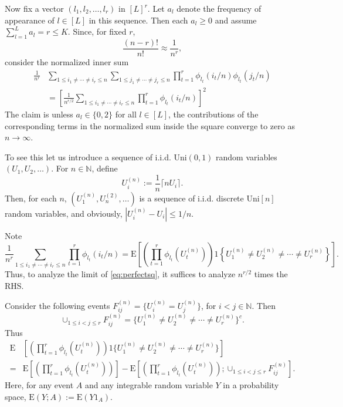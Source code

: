 \documentclass{amsart}
\newcommand{\NN}{\mathbb{N}}
\newcommand{\abs}[1]{\left\lvert #1 \right\rvert}
\newcommand{\E}{\mathrm{E}}
\begin{document}
Now fix a vector $(l_1, l_2, \ldots, l_r)$ in $[L]^r$. Let $a_l$ denote the frequency of appearance of $l\in [L]$ in this sequence. Then each $a_l\ge 0$ and assume $\sum_{l=1}^L a_l =r\le K$. Since, for fixed $r$, 
\[
\frac{(n-r)!}{n!} \approx \frac{1}{n^r}, 
\]
consider the normalized inner sum
\begin{equation}\label{eq:perfectsq}
\begin{split}
    \frac{1}{n^r} &\sum_{1\le i_1 \neq \cdots \neq i_r \le n} \sum_{1\le j_1 \neq \cdots \neq j_r \le n} \prod_{t=1}^r \phi_{l_t}(i_t/n) \phi_{l_t}(j_t/n)\\
    &=\left[ \frac{1}{n^{r/2}} \sum_{1\le i_1 \neq \cdots \neq i_r \le n}  \prod_{t=1}^r \phi_{l_t}(i_t/n) \right]^2
\end{split}
\end{equation}
The claim is unless $a_l\in \{0, 2\}$ for all $l\in [L]$, the contributions of the corresponding terms in the normalized sum inside the square converge to zero as $n\rightarrow \infty$. 

To see this let us introduce a sequence of i.i.d. Uni$(0,1)$ random variables $(U_1, U_2, \ldots)$. For $n \in \NN$, define 
\[
U_i^{(n)}:=\frac{1}{n} \lceil n U_i \rceil.
\]
Then, for each $n$, $\left( U_1^{(n)}, U^{(2)}_n, \ldots \right)$ is a sequence of i.i.d. discrete Uni$[n]$ random variables, and obviously, $\abs{U_i^{(n)} - U_i}\le 1/n$. 

Note  
\[
\frac{1}{n^r}\sum_{1\le i_1 \neq \cdots \neq i_r \le n}  \prod_{t=1}^r \phi_{l_t}(i_t/n)=\E\left[\left(\prod_{t=1}^r \phi_{l_t}\left(U^{(n)}_t\right)\right) 1\left\{ U^{(n)}_1 \neq U^{(n)}_2 \neq \cdots \neq U^{(n)}_r\right\} \right].
\]
Thus, to analyze the limit of \eqref{eq:perfectsq}, it suffices to analyze $n^{r/2}$ times the RHS. 

Consider the following events $F^{(n)}_{ij}=\{U^{(n)}_i = U^{(n)}_j\}$, for $i< j \in \NN$. Then 
\[
\cup_{1\le i< j\le r} F^{(n)}_{ij}= \{U^{(n)}_1 \neq U^{(n)}_2 \neq \cdots \neq U^{(n)}_r\}^c.
\]
Thus
\[
\begin{split}
\E&\left[\left(\prod_{t=1}^r \phi_{l_t}(U^{(n)}_t)\right) 1\{ U^{(n)}_1 \neq U^{(n)}_2 \neq \cdots \neq U^{(n)}_r\} \right]\\
=& \E\left[\left(\prod_{t=1}^r \phi_{l_t}(U^{(n)}_t)\right)\right]
-\E\left[\left(\prod_{t=1}^r \phi_{l_t}(U^{(n)}_t)\right); \cup_{1\le i < j \le r} F^{(n)}_{ij} \right].
\end{split}
\]
Here, for any event $A$ and any integrable random variable $Y$ in a probability space, $\E(Y;A):=\E(Y1_A)$.
\end{document}
